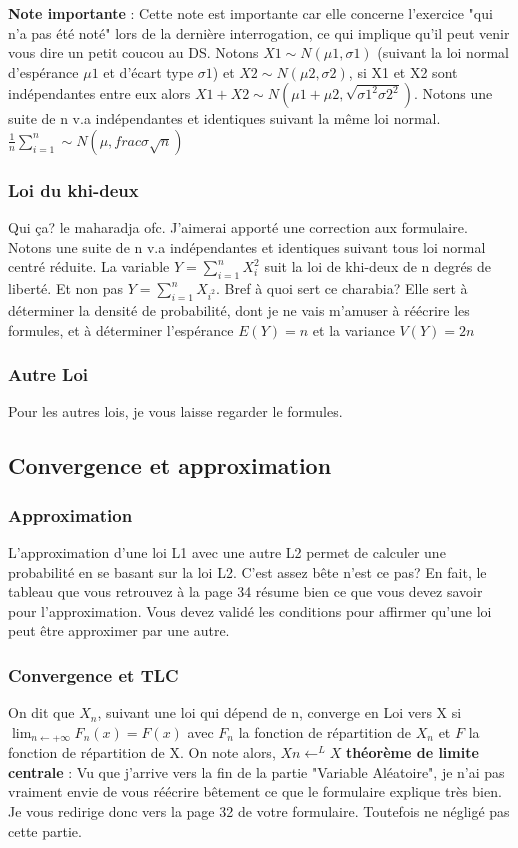 \documentclass[a4paper]{article}
\begin{document}
\textbf{Note importante} : Cette note est importante car elle concerne l'exercice "qui n'a pas été noté" lors de la dernière interrogation, ce qui implique qu'il peut venir vous dire un petit coucou au DS. Notons $X1 \sim N(\mu 1, \sigma 1)$ (suivant la loi normal d'espérance $\mu 1$ et d'écart type $\sigma 1$) et $X2 \sim N(\mu 2, \sigma 2)$, si X1 et X2 sont indépendantes entre eux alors $X1+X2 \sim N(\mu 1 + \mu 2, \sqrt{\sigma 1^2\sigma 2^2})$. \newline
Notons une suite de n v.a indépendantes et identiques suivant la même loi normal. $\frac{1}{n} \sum_{i=1}^n \sim N(\mu, frac{\sigma}{\sqrt{n}})$

\subsubsection{Loi du khi-deux}
Qui ça? le maharadja ofc. J'aimerai apporté une correction aux formulaire. Notons une suite de n v.a indépendantes et identiques suivant tous loi normal centré réduite. La variable $Y = \sum_{i=1}^n X_i^2$ suit la loi de khi-deux de n degrés de liberté. Et non pas $Y = \sum_{i=1}^n X_{i^2}$. \newline
Bref à quoi sert ce charabia? Elle sert à déterminer la densité de probabilité, dont je ne vais m'amuser à réécrire les formules, et à déterminer l'espérance $E(Y)= n$ et la variance $V(Y)= 2n$

\subsubsection{Autre Loi}
Pour les autres lois, je vous laisse regarder le formules.

\subsection{Convergence et approximation}

\subsubsection{Approximation}
L'approximation d'une loi L1 avec une autre L2 permet de calculer une probabilité en se basant sur la loi L2. C'est assez bête n'est ce pas? En fait, le tableau que vous retrouvez à la page 34 résume bien ce que vous devez savoir pour l'approximation. Vous devez validé les conditions pour affirmer qu'une loi peut être approximer par une autre.

\subsubsection{Convergence et TLC}
On dit que $X_n$, suivant une loi qui dépend de n, converge en Loi vers X si $\lim_{n\leftarrow +\infty}  F_n(x) = F(x) $ avec $F_n$ la fonction de répartition de $X_n$ et $F$ la fonction de répartition de X. On note alors, $Xn \leftarrow^L X$
\textbf{théorème de limite centrale} : Vu que j'arrive vers la fin de la partie "Variable Aléatoire", je n'ai pas vraiment envie de vous réécrire bêtement ce que le formulaire explique très bien. Je vous redirige donc vers la page 32 de votre formulaire. Toutefois ne négligé pas cette partie.
\end{document}
